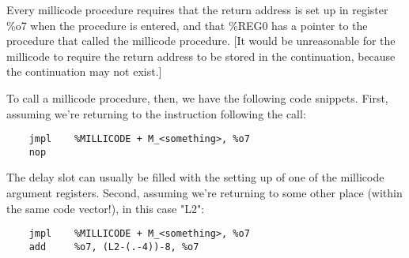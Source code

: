 Every millicode procedure requires that the return address is set up
in register \%o7 when the procedure is entered, and that \%REG0 has a
pointer to the procedure that called the millicode procedure.  [It
would be unreasonable for the millicode to require the return address
to be stored in the continuation, because the continuation may not
exist.]

To call a millicode procedure, then, we have the following code
snippets. First, assuming we're returning to the instruction
following the call:

\begin{minipage}{\linewidth}
\begin{verbatim}
    jmpl    %MILLICODE + M_<something>, %o7
    nop
\end{verbatim}
\end{minipage}

The delay slot can usually be filled with the setting up of one of 
the millicode argument registers.
Second, assuming we're returning to some other place (within the same
code vector!), in this case "L2":

\begin{minipage}{\linewidth}
\begin{verbatim}
    jmpl    %MILLICODE + M_<something>, %o7
    add     %o7, (L2-(.-4))-8, %o7
\end{verbatim}
\end{minipage}


